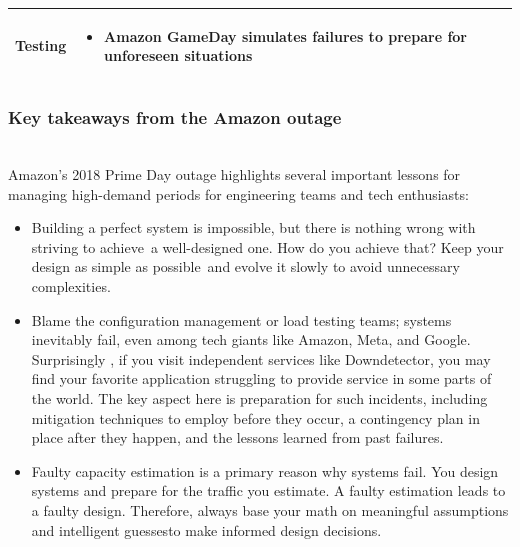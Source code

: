 \begin{table}[htbp]
{\begin{tabular}{|p{}|p{}|}
\hline
Testing & \begin{itemize} \tightlist \item \textbf{Amazon GameDay} simulates failures to prepare for unforeseen situations \end{itemize} \\
\hline
\end{tabular}
}
\end{table}

\subsubsection{Key takeaways from the Amazon outage}\label{SWjF181T60gdvRwInKmyW}
\\
Amazon's 2018 Prime Day outage highlights several important lessons for managing high-demand periods for engineering teams and tech enthusiasts:

\begin{itemize}
\item
\protect{}\label{QeZH9QP3yYycbEX6kHKJH}
Building a perfect system is impossible, but there is nothing wrong with striving to achieve~a well-designed one. How do you achieve that? Keep your design as simple as possible~and evolve it slowly to avoid unnecessary complexities.
\item
\protect{}\label{dh_R-xcTUsmcY3Uwt0UPN}
Blame the configuration management or load testing teams; systems inevitably fail, even among tech giants like Amazon, Meta, and Google. Surprisingly , if you visit independent services like Downdetector, you may find your favorite application struggling to provide service in some parts of the world. The key aspect here is preparation for such incidents, including mitigation techniques to employ before they occur, a contingency plan in place after they happen, and the lessons learned from past failures.
\item
\protect{}\label{cCoy_I09xHMJ3Ufc7Bj4E}
Faulty capacity estimation is a primary reason why systems fail. You design systems and prepare for the traffic you estimate. A faulty estimation leads to a faulty design. Therefore, always base your math on meaningful assumptions and intelligent guessesto make informed design decisions.
\end{itemize}

